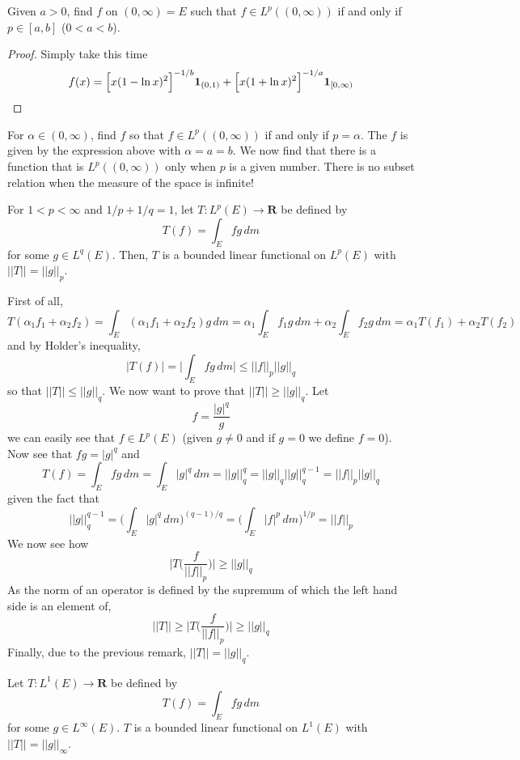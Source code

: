 \vspace{2ex}
\begin{ex}
Given $a>0$, find $f$ on $(0,\infty )=E$ such that $f\in L^{p}((0,\infty ))$ if and only if $p\in [a,b]$ ($0<a<b$). 
\end{ex}
\vspace{2ex}
\begin{proof}
Simply take this time
\[f(x)=\Big[x(1-\ln x)^2\Big]^{-1/b}{\bf 1}_{(0,1)}+\Big[x(1+\ln x)^2\Big]^{-1/a}{\bf 1}_{[0,\infty )}\]
\end{proof}
\vspace{2ex}
\begin{ex}
For $\alpha \in (0,\infty )$, find $f$ so that $f\in L^{p}((0,\infty ))$ if and only if $p=\alpha $. The $f$ is given by the expression above with $\alpha =a=b$. We now find that there is a function that is $L^{p}((0,\infty ))$ only when $p$ is a given number. There is no subset relation when the measure of the space is infinite!
\end{ex}
\vspace{2ex}
\begin{thm}
For $1<p<\infty $ and $1/p+1/q=1$, let $T:L^{p}(E)\rightarrow {\bm R}$ be defined by
\[T(f)=\int _{E}fg\,d m\]
for some $g\in L^{q}(E)$. Then, $T$ is a bounded linear functional on $L^{p}(E)$ with $||T||=||g||_{p}$. 
\end{thm}
\vspace{2ex}
\begin{rmk}
First of all, 
\[T(\alpha_1f_1+\alpha_2f_2)=\int _{E}(\alpha_1f_1+\alpha_2f_2)g\,d m=\alpha_1\int _{E}f_1g\,d m+\alpha_2\int _{E}f_2g\,d m=\alpha_1T(f_1)+\alpha_2T(f_2)\]
and by Holder's inequality, 
\[|T(f)|=\Big|\int _{E}fg\,d m\Big|\leq ||f||_{p}||g||_{q}\]
so that $||T||\leq ||g||_{q}$. We now want to prove that $||T||\geq ||g||_{q}$. Let
\[f=\dfrac{|g|^{q}}{g}\]
we can easily see that $f\in L^{p}(E)$ (given $g\ne 0$ and if $g=0$ we define $f=0$). Now see that $fg=|g|^{q}$ and 
\[T(f)=\int _{E}fg\, dm=\int _{E}|g|^{q}\,d m=||g||_{q}^{q}=||g||_{q}||g||_{q}^{q-1}=||f||_{p}||g||_{q}\]
given the fact that
\[||g||^{q-1}_{q}=\Big(\int _{E}|g|^{q}\,d m\Big)^{(q-1)/q}=\Big(\int _{E}|f|^{p}\,d m\Big)^{1/p}=||f||_{p}\]
We now see how
\[\Big|T\Big(\dfrac{f}{||f||_{p}}\Big)\Big|\geq ||g||_{q}\]
As the norm of an operator is defined by the supremum of which the left hand side is an element of,
\[||T||\geq \Big|T\Big(\dfrac{f}{||f||_{p}}\Big)\Big| \geq ||g||_{q}\]
Finally, due to the previous remark, $||T||=||g||_{q}$. 
\end{rmk}
\vspace{2ex}

\begin{cor}
Let $T:L^{1}(E)\rightarrow {\bm R}$ be defined by
\[T(f)=\int _{E}fg\,d m\]
for some $g\in L^{\infty }(E)$. $T$ is a bounded linear functional on $L^{1}(E)$ with $||T||=||g||_{\infty }$.
\end{cor}
\vspace{2ex}


